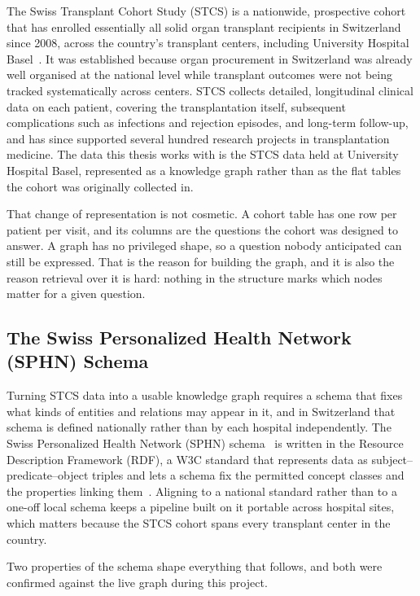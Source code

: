 The Swiss Transplant Cohort Study (STCS) is a nationwide, prospective cohort that
has enrolled essentially all solid organ transplant recipients in Switzerland
since 2008, across the country's transplant centers, including University
Hospital Basel~\cite{koller2013stcs}. It was established because organ
procurement in Switzerland was already well organised at the national level while
transplant outcomes were not being tracked systematically across centers. STCS
collects detailed, longitudinal clinical data on each patient, covering the
transplantation itself, subsequent complications such as infections and rejection
episodes, and long-term follow-up, and has since supported several hundred
research projects in transplantation medicine. The data this thesis works with is
the STCS data held at University Hospital Basel, represented as a knowledge graph
rather than as the flat tables the cohort was originally collected in.

That change of representation is not cosmetic. A cohort table has one row per
patient per visit, and its columns are the questions the cohort was designed to
answer. A graph has no privileged shape, so a question nobody anticipated can
still be expressed. That is the reason for building the graph, and it is also the
reason retrieval over it is hard: nothing in the structure marks which nodes
matter for a given question.

\subsection{The Swiss Personalized Health Network (SPHN) Schema} \label{subsec:sphn-schema}

Turning STCS data into a usable knowledge graph requires a schema that fixes what
kinds of entities and relations may appear in it, and in Switzerland that schema
is defined nationally rather than by each hospital independently. The Swiss
Personalized Health Network (SPHN) schema~\cite{sphnschema} is written in the
Resource Description Framework (RDF), a W3C standard that represents data as
subject--predicate--object triples and lets a schema fix the permitted concept
classes and the properties linking them~\cite{rdfschema}. Aligning to a national
standard rather than to a one-off local schema keeps a pipeline built on it
portable across hospital sites, which matters because the STCS cohort spans every
transplant center in the country.

Two properties of the schema shape everything that follows, and both were
confirmed against the live graph during this project.

